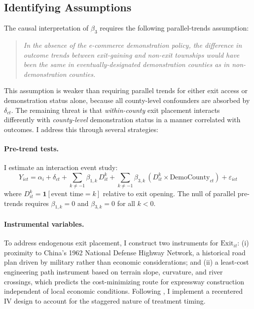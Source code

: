 \documentclass[12pt]{article}
\begin{document}
\subsection{Identifying Assumptions}

The causal interpretation of $\beta_3$ requires the following parallel-trends assumption:

\begin{quote}
\textit{In the absence of the e-commerce demonstration policy, the difference in outcome trends between exit-gaining and non-exit townships would have been the same in eventually-designated demonstration counties as in non-demonstration counties.}
\end{quote}

This assumption is weaker than requiring parallel trends for either exit access or demonstration status alone, because all county-level confounders are absorbed by $\delta_{ct}$. The remaining threat is that \textit{within-county} exit placement interacts differently with \textit{county-level} demonstration status in a manner correlated with outcomes. I address this through several strategies:

\paragraph{Pre-trend tests.} I estimate an interaction event study:
\begin{equation}
    Y_{ict} = \alpha_i + \delta_{ct} + \sum_{k \neq -1} \beta_{1,k} \, D^k_{it} + \sum_{k \neq -1} \beta_{3,k} \, (D^k_{it} \times \text{DemoCounty}_{ct}) + \varepsilon_{ict}
\end{equation}
where $D^k_{it} = \mathbf{1}[\text{event time} = k]$ relative to exit opening. The null of parallel pre-trends requires $\beta_{1,k} = 0$ and $\beta_{3,k} = 0$ for all $k < 0$.

\paragraph{Instrumental variables.} To address endogenous exit placement, I construct two instruments for $\text{Exit}_{it}$: (i) proximity to China's 1962 National Defense Highway Network, a historical road plan driven by military rather than economic considerations; and (ii) a least-cost engineering path instrument based on terrain slope, curvature, and river crossings, which predicts the cost-minimizing route for expressway construction independent of local economic conditions. Following \citet{borusyak2023}, I implement a recentered IV design to account for the staggered nature of treatment timing.
\end{document}
